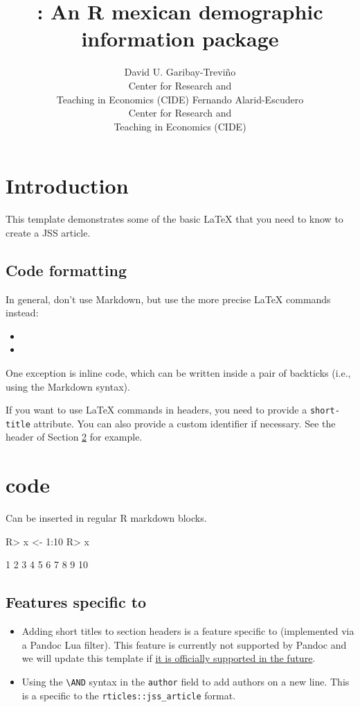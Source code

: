 \documentclass[
]{jss}
\author{
David U. Garibay-Treviño\\Center for Research and\\
Teaching in Economics (CIDE) \And Fernando Alarid-Escudero\\Center for
Research and\\
Teaching in Economics (CIDE)
}
\title{\pkg{demogmx}: An R mexican demographic information package}
\providecommand{\tightlist}{%
  \setlength{\itemsep}{0pt}\setlength{\parskip}{0pt}}
\begin{document}
\hypertarget{introduction}{%
\section{Introduction}\label{introduction}}

This template demonstrates some of the basic LaTeX that you need to know
to create a JSS article.

\hypertarget{code-formatting}{%
\subsection{Code formatting}\label{code-formatting}}

In general, don't use Markdown, but use the more precise LaTeX commands
instead:

\begin{itemize}
\item
\item
\end{itemize}

One exception is inline code, which can be written inside a pair of
backticks (i.e., using the Markdown syntax).

If you want to use LaTeX commands in headers, you need to provide a
\texttt{short-title} attribute. You can also provide a custom identifier
if necessary. See the header of Section \ref{r-code} for example.

\section[R code]{ code}\label{r-code}

Can be inserted in regular R markdown blocks.

\begin{CodeChunk}
\begin{CodeInput}
R> x <- 1:10
R> x
\end{CodeInput}
\begin{CodeOutput}
 [1]  1  2  3  4  5  6  7  8  9 10
\end{CodeOutput}
\end{CodeChunk}

\subsection[Features specific to rticles]{Features specific to
}\label{features-specific-to}

\begin{itemize}
\tightlist
\item
  Adding short titles to section headers is a feature specific to
   (implemented via a Pandoc Lua filter). This feature is
  currently not supported by Pandoc and we will update this template if
  \href{https://github.com/jgm/pandoc/issues/4409}{it is officially
  supported in the future}.
\item
  Using the \texttt{\textbackslash{}AND} syntax in the \texttt{author}
  field to add authors on a new line. This is a specific to the
  \texttt{rticles::jss\_article} format.
\end{itemize}
\end{document}
